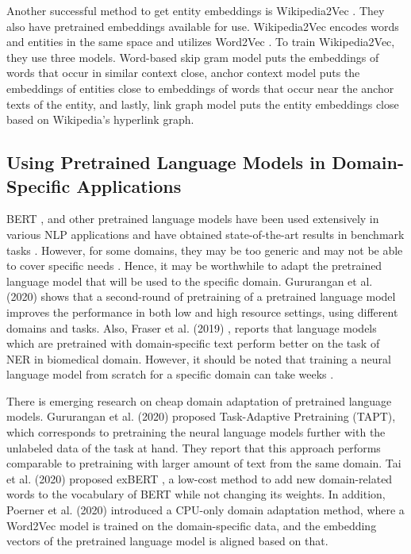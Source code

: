 \documentclass{report}
\theoremstyle{definition}
\theoremstyle{remark}
\begin{document}
Another successful method to get entity embeddings is Wikipedia2Vec \cite{wikipedia2vec2}. They also have pretrained embeddings available for use. Wikipedia2Vec encodes words and entities in the same space and utilizes Word2Vec \cite{w2v}. To train Wikipedia2Vec, they use three models. Word-based skip gram model puts the embeddings of words that occur in similar context close, anchor context model puts the embeddings of entities close to embeddings of words that occur near the anchor texts of the entity, and lastly, link graph model puts the entity embeddings close based on Wikipedia's hyperlink graph. 





\subsection{Using Pretrained Language Models in Domain-Specific Applications}
\label{preLMDiffDomain}
BERT \cite{BERT}, and other pretrained language models have been used extensively in various NLP applications and have obtained state-of-the-art results in benchmark tasks \cite{pretrainedLM}. However, for some domains, they may be too generic and may not be able to cover specific needs \cite{quote2}. Hence, it may be worthwhile to adapt the pretrained language model that will be used to the specific domain. Gururangan et al. (2020) \cite{DontStop} shows that a second-round of pretraining of a pretrained language model improves the performance in both low and high resource settings, using different domains and tasks. Also, Fraser et al. (2019) \cite{quote3}, reports that language models which are pretrained with domain-specific text perform better on the task of NER in biomedical domain. However, it should be noted that training a neural language model from scratch for a specific domain can take weeks \cite{tritrain}. 

There is emerging research on cheap domain adaptation of pretrained language models. Gururangan et al. (2020) \cite{DontStop} proposed Task-Adaptive Pretraining (TAPT), which corresponds to pretraining the neural language models further with the unlabeled data of the task at hand. They report that this approach performs comparable to pretraining with larger amount of text from the same domain. Tai et al. (2020) proposed exBERT \cite{exBERT}, a low-cost method to add new domain-related words to the vocabulary of BERT \cite{BERT} while not changing its weights. In addition, Poerner et al. (2020) \cite{word2vectoBERT} introduced a CPU-only domain adaptation method, where a Word2Vec \cite{w2v} model is trained on the domain-specific data, and the embedding vectors of the pretrained language model is aligned based on that.
\end{document}
